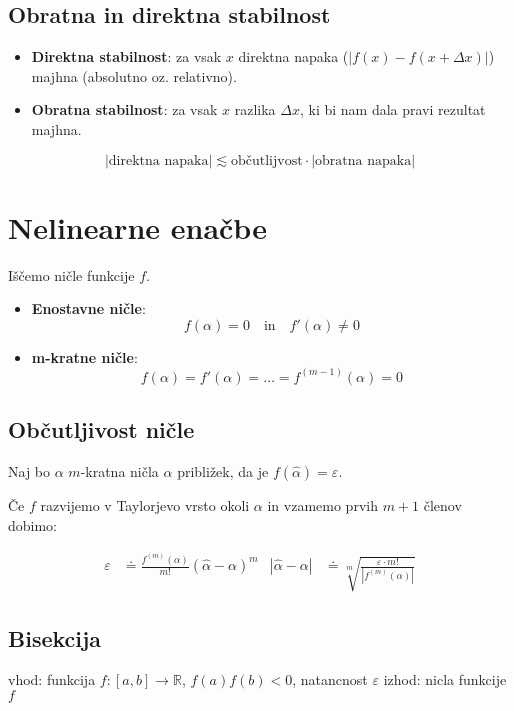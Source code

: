\begin{multicols}{4}
\subsection{Obratna in direktna stabilnost}
\begin{itemize}
	\item \textbf{Direktna stabilnost}: za vsak $x$ direktna napaka ($|f(x) - f(x + \Delta x)|$) majhna (absolutno oz. relativno).
	\item \textbf{Obratna stabilnost}: za vsak $x$ razlika $\Delta x$, ki bi nam dala pravi rezultat majhna.
\end{itemize}

\[ |\text{direktna napaka}| \lesssim \text{občutlijvost} \cdot |\text{obratna napaka}|\]

\section{Nelinearne enačbe}
Iščemo ničle funkcije $f$.
\begin{itemize}
	\item \textbf{Enostavne ničle}: 
	\[f(\alpha) = 0 \quad \text{in} \quad f'(\alpha) \neq 0\]
	\item \textbf{m-kratne ničle}: 
	\[f(\alpha) = f'(\alpha) = \dots = f^{(m-1)}(\alpha) = 0\]
\end{itemize}

\subsection{Občutljivost ničle}
Naj bo $\alpha$  $m$-kratna ničla $\hat{\alpha}$ približek, da je $f(\hat{\alpha}) = \varepsilon$.

Če $f$ razvijemo v Taylorjevo vrsto okoli $\alpha$ in vzamemo prvih $m+1$ členov dobimo:

\begin{align*}
	\varepsilon &\doteq \frac{f^{(m)} (\alpha)}{ m! }(\hat{\alpha} - \alpha )^m &
	|\hat{\alpha} - \alpha| &\doteq \sqrt[m]{\frac{\varepsilon \cdot m!}{|f^{(m)} (\alpha)|}}
\end{align*}


\subsection{Bisekcija}

\begin{koda}[]
vhod: funkcija $f: [a,b] \to \mathbb{R}$, $f(a)f(b) < 0$, natancnost $\varepsilon$
izhod: nicla funkcije $f$


\end{koda}
\end{multicols}
